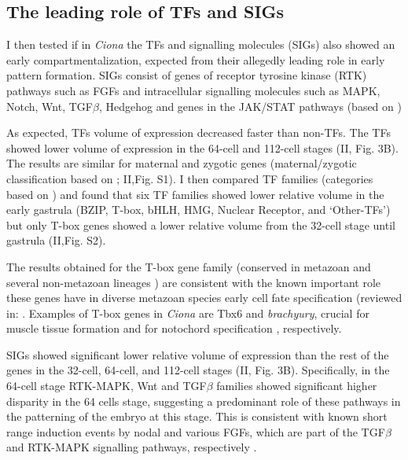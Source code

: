 \subsection{The leading role of TFs and SIGs}
I then tested if in \textit{Ciona} the TFs and signalling molecules (SIGs) also showed an early compartmentalization, expected from their allegedly leading role in early pattern formation.
SIGs consist of genes of receptor tyrosine kinase (RTK) pathways such as FGFs and intracellular signalling molecules such as MAPK, Notch, Wnt, TGF$\beta$, Hedgehog and genes in the JAK/STAT pathways (based on \citealp{Imai2004}) 

As expected, TFs volume of expression decreased faster than non-TFs. The TFs showed lower volume of expression in the 64-cell and 112-cell stages (II, Fig. 3B). The results are similar for maternal and zygotic genes (maternal/zygotic classification based on \citealp{Matsuoka2013}; II,Fig. S1).
I then compared TF families (categories based on \citealp{Imai2004}) and found that six TF families showed lower relative volume in the early gastrula (BZIP, T-box, bHLH, HMG, Nuclear Receptor, and `Other-TFs') but only T-box genes showed a lower relative volume from the 32-cell stage until gastrula (II,Fig. S2). 

The results obtained for the T-box gene family (conserved in metazoan and several non-metazoan lineages \citep{Sebe-Pedros2013}) are consistent with the known important role these genes have in diverse metazoan species early cell fate specification (reviewed in: \citealp{Papaioannou2014,Showell2004}.
Examples of T-box genes in \textit{Ciona} are Tbx6 and \textit{brachyury}, crucial for muscle tissue formation \citep{Mitani1999,Nishida2005} and for notochord specification \citep{Yasuo1998}, respectively.
 
SIGs showed significant lower relative volume of expression than the rest of the genes in the 32-cell, 64-cell, and 112-cell stages (II, Fig. 3B).
Specifically, in the 64-cell stage RTK-MAPK, Wnt and TGF$\beta$ families showed significant higher disparity in the 64 cells stage, suggesting a predominant role of these pathways in the patterning of the embryo at this stage. 
This is consistent with known short range induction events by nodal and various FGFs, which are part of the TGF$\beta$ and RTK-MAPK signalling pathways, respectively \citep{Lemaire2008}.


